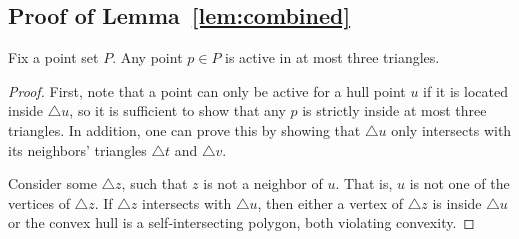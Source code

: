 \documentclass{cccg24}
\newcommand{\Tri}[3]{\triangle #1#2#3}
\newcommand{\TriS}[1]{\triangle #1}
\newenvironment{customlemma}[1]
  {\renewcommand\theinnercustomthm{#1}\innercustomthm}
  {\endinnercustomthm}
\begin{document}
\subsection{Proof of Lemma~\ref{lem:combined}}\label{sec:app_lemma_combined}
\begin{customlemma}{\ref{lem:combined}(1)}%
    Fix a point set $P$. Any point $p \in P$ %
is active in at most three triangles.%
\end{customlemma}\begin{proof}
    First, note that a point can only be active for a hull point $u$ if it is located inside $\TriS u$, so it is sufficient to show that any $p$ is strictly inside at most three triangles. In addition, one can prove this by showing that $\TriS u$ only intersects with its neighbors' triangles $\TriS t$ and $\TriS v$. 

    Consider some $\TriS z$, such that $z$ is not a neighbor of $u$. That is, $u$ is not one of the vertices of $\TriS z$. If $\TriS z$ intersects with $\TriS u$, then either a vertex of $\TriS z$ is inside $\TriS u$ or the convex hull is a self-intersecting polygon, both violating convexity.


    



\end{proof}
\end{document}
